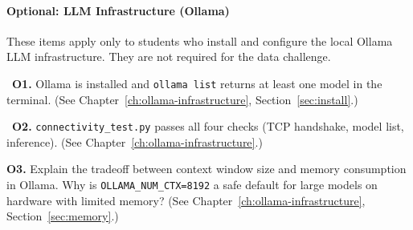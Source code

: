 \begin{Form}
\paragraph{Optional: LLM Infrastructure (Ollama)}
\label{sec:assess-optional}

These items apply only to students who install and configure the
local Ollama LLM infrastructure. They are not required for the data
challenge.

\vs

\noindent\CheckBox[name=o1,width=0.4cm,height=0.4cm]{}~\textbf{O1.}
Ollama is installed and \texttt{ollama list} returns at least one
model in the terminal.
(See Chapter~\ref{ch:ollama-infrastructure},
Section~\ref{sec:install}.)

\vs

\noindent\CheckBox[name=o2,width=0.4cm,height=0.4cm]{}~\textbf{O2.}
\texttt{connectivity\_test.py} passes all four checks (TCP
handshake, model list, inference).
(See Chapter~\ref{ch:ollama-infrastructure}.)

\vs

\noindent\textbf{O3.} Explain the tradeoff between context window
size and memory consumption in Ollama. Why is \texttt{OLLAMA\_NUM\_CTX=8192}
a safe default for large models on hardware with limited memory?
(See Chapter~\ref{ch:ollama-infrastructure},
Section~\ref{sec:memory}.)\\[4pt]
\TextField[name=o3,width=\linewidth,height=3cm,multiline=true,
           bordercolor=black]{}

\end{Form}
